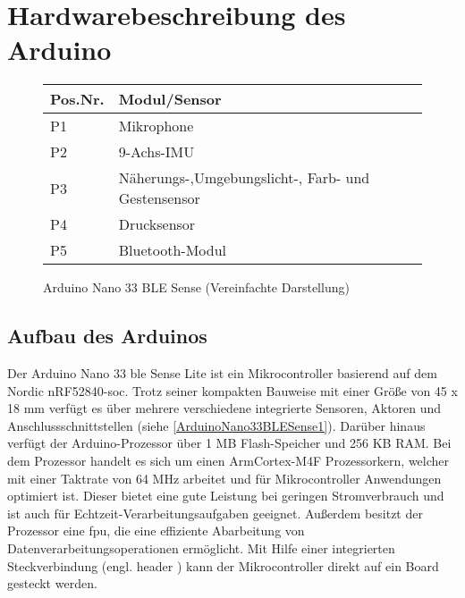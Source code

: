 %
%
%

\chapter{Hardwarebeschreibung des Arduino}
\begin{figure}[htb]
		
		\caption{Arduino Nano 33 BLE Sense (Vereinfachte Darstellung)} \label{ArduinoNano33BLESense1}
		\begin{tabularx}{\textwidth}{|p{1.5cm}|X|}
			\hline
			\textbf{Pos.Nr.} & \textbf{Modul/Sensor} \\
			\hline
			P1 & Mikrophone \\
			\hline
			P2 & 9-Achs-IMU \\
			\hline
			P3 & Näherungs-,Umgebungslicht-, Farb- und Gestensensor \\
			\hline
			P4 & Drucksensor \\
			\hline
			P5 & Bluetooth-Modul \\
			\hline
		\end{tabularx}
		 \label{ArduinoNano33BLESense2}
\end{figure}

\section{Aufbau des Arduinos}

Der Arduino Nano 33 \ac{ble} Sense Lite ist ein Mikrocontroller basierend auf dem Nordic nRF52840-\ac{soc}. Trotz seiner kompakten Bauweise mit einer Größe von 45 x 18 mm verfügt es über mehrere verschiedene integrierte Sensoren, Aktoren und Anschlussschnittstellen (siehe \autoref{ArduinoNano33BLESense1}). Darüber hinaus verfügt der Arduino-Prozessor über 1 MB Flash-Speicher und 256 KB RAM. Bei dem Prozessor handelt es sich um einen Arm\textregistered Cortex-M4F Prozessorkern, welcher mit einer Taktrate von 64 MHz arbeitet und für Mikrocontroller Anwendungen optimiert ist. Dieser bietet eine gute Leistung bei geringen Stromverbrauch und ist auch für Echtzeit-Verarbeitungsaufgaben geeignet. Außerdem besitzt der Prozessor eine \ac{fpu}, die eine effiziente Abarbeitung von Datenverarbeitungsoperationen ermöglicht. Mit Hilfe einer integrierten Steckverbindung (engl. \glqq header \grqq) kann der Mikrocontroller direkt auf ein Board gesteckt werden. \cite{Arm.2020} \cite{Ard.2024}

